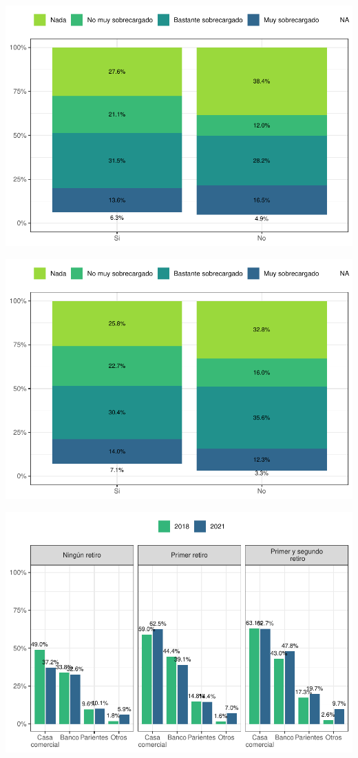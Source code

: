 \documentclass[
  12pt,
]{book}
\begin{document}
\begin{center}\includegraphics{reporte-elsoc_files/figure-latex/endeud-1retiro-1} \end{center}

\begin{center}\includegraphics{reporte-elsoc_files/figure-latex/endeud-2retiro-1} \end{center}

\begin{center}\includegraphics{reporte-elsoc_files/figure-latex/deuda-retiro1-1} \end{center}
\end{document}
